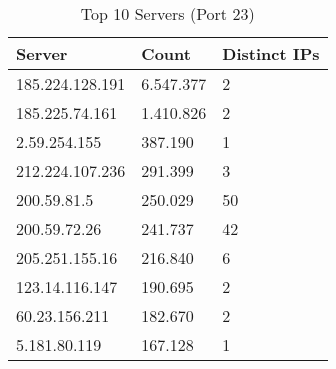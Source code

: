 \begin{table}
\caption{Top 10 Servers (Port 23)}
\label{tab:top10_servers_23}
\begin{tabular}{lll}
\toprule
Server & Count & Distinct IPs \\
\midrule
185.224.128.191 & 6.547.377 & 2 \\
185.225.74.161 & 1.410.826 & 2 \\
2.59.254.155 & 387.190 & 1 \\
212.224.107.236 & 291.399 & 3 \\
200.59.81.5 & 250.029 & 50 \\
200.59.72.26 & 241.737 & 42 \\
205.251.155.16 & 216.840 & 6 \\
123.14.116.147 & 190.695 & 2 \\
60.23.156.211 & 182.670 & 2 \\
5.181.80.119 & 167.128 & 1 \\
\bottomrule
\end{tabular}
\end{table}
